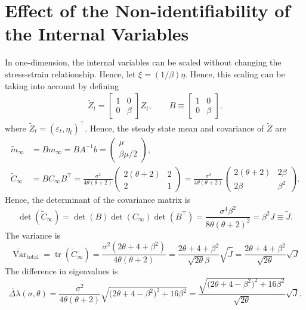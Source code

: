 \documentclass[11pt]{article}
\begin{document}
\section{Effect of the Non-identifiability of the Internal Variables}
In one-dimension, the internal variables can be scaled without changing the stress-strain relationship. Hence, let $\xi = (1/\beta)\eta$. Hence, this scaling can be taking into account by defining
\begin{align}
    \widetilde{Z}_t =\begin{bmatrix} 1 & 0     \\
                0 & \beta\end{bmatrix} Z_t,\qquad B \equiv \begin{bmatrix} 1 & 0     \\
                0 & \beta\end{bmatrix}.
\end{align}
where $\widetilde{Z}_t = (\varepsilon_t, \eta_t)^\top$. Hence, the steady state mean and covariance of $\widetilde{Z}$ are
\begin{align}
    \widetilde{m}_\infty
     & =B m_\infty = B A^{-1}b = \begin{pmatrix}\mu \\ \beta\mu/2\end{pmatrix},
    \\
    \widetilde{C}_\infty
     & = B C_\infty B^\top = \frac{\sigma^2}{4\theta(\theta+2)}
    \begin{pmatrix}
        2(\theta+2) & 2 \\
        2           & 1
    \end{pmatrix} =\frac{\sigma^2}{4\theta(\theta+2)}
    \begin{pmatrix}
        2(\theta+2) & 2\beta  \\
        2\beta      & \beta^2
    \end{pmatrix}.
\end{align}
Hence,
the determinant of the covariance matrix is
\begin{equation}
    \det(\widetilde{C}_\infty)
    =\det(B)\det(C_\infty)\det(B^\top) = \frac{\sigma^4 \beta^2}{8\theta(\theta+2)^2}=\beta^2 J \equiv \widetilde{J}.
\end{equation}
The variance is
\begin{equation}
    \widetilde{\operatorname{Var}}_{\mathrm{total}}
    =\operatorname{tr}(\widetilde{C}_\infty)
    =\frac{\sigma^2(2\theta+4 + \beta^2)}{4\theta(\theta+2)}
    =\frac{2\theta+4 + \beta^2}{\sqrt{2\theta} \beta}\sqrt{\widetilde{J}}
    =\frac{2\theta+4 + \beta^2}{\sqrt{2\theta}}\sqrt{{J}}
\end{equation}
The difference in eigenvalues is
\begin{equation}
    \widetilde{\Delta\lambda}(\sigma,\theta)
    =\frac{\sigma^2}{4\theta(\theta+2)}
    \sqrt{\bigl(2\theta+4-\beta^2\bigr)^2+16\beta^2}
    =\frac{\sqrt{\bigl(2\theta+4-\beta^2\bigr)^2+16\beta^2}}
    {\sqrt{2\theta}}\sqrt{J}.
\end{equation}
\end{document}

